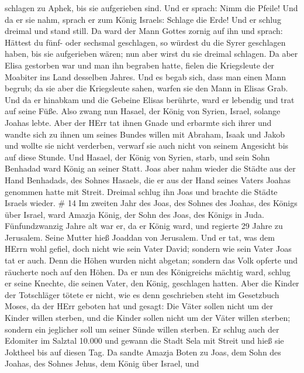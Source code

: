 schlagen zu Aphek, bis sie aufgerieben sind.  Und er
sprach: Nimm die Pfeile! Und da er sie nahm, sprach er zum König
Israels: Schlage die Erde! Und er schlug dreimal und stand still.
 Da ward der Mann Gottes zornig auf ihn und sprach: Hättest
du fünf- oder sechsmal geschlagen, so würdest du die Syrer geschlagen
haben, bis sie aufgerieben wären; nun aber wirst du sie dreimal
schlagen.  Da aber Elisa gestorben war und man ihn begraben
hatte, fielen die Kriegsleute der Moabiter ins Land desselben Jahres.
 Und es begab sich, dass man einen Mann begrub; da sie aber
die Kriegsleute sahen, warfen sie den Mann in Elisas Grab. Und da er
hinabkam und die Gebeine Elisas berührte, ward er lebendig und trat auf
seine Füße.  Also zwang nun Hasael, der König von Syrien,
Israel, solange Joahas lebte.  Aber der HErr tat ihnen
Gnade und erbarmte sich ihrer und wandte sich zu ihnen um seines Bundes
willen mit Abraham, Isaak und Jakob und wollte sie nicht verderben,
verwarf sie auch nicht von seinem Angesicht bis auf diese Stunde.
 Und Hasael, der König von Syrien, starb, und sein Sohn
Benhadad ward König an seiner Statt.  Joas aber nahm wieder
die Städte aus der Hand Benhadads, des Sohnes Hasaels, die er aus der
Hand seines Vaters Joahas genommen hatte mit Streit. Dreimal schlug ihn
Joas und brachte die Städte Israels wieder. \# 14  Im
zweiten Jahr des Joas, des Sohnes des Joahas, des Königs über Israel,
ward Amazja König, der Sohn des Joas, des Königs in Juda. 
Fünfundzwanzig Jahre alt war er, da er König ward, und regierte 29 Jahre
zu Jerusalem. Seine Mutter hieß Joaddan von Jerusalem.  Und
er tat, was dem HErrn wohl gefiel, doch nicht wie sein Vater David;
sondern wie sein Vater Joas tat er auch.  Denn die Höhen
wurden nicht abgetan; sondern das Volk opferte und räucherte noch auf
den Höhen.  Da er nun des Königreichs mächtig ward, schlug
er seine Knechte, die seinen Vater, den König, geschlagen hatten.
 Aber die Kinder der Totschläger tötete er nicht, wie es
denn geschrieben steht im Gesetzbuch Moses, da der HErr geboten hat und
gesagt: Die Väter sollen nicht um der Kinder willen sterben, und die
Kinder sollen nicht um der Väter willen sterben; sondern ein jeglicher
soll um seiner Sünde willen sterben.  Er schlug auch der
Edomiter im Salztal 10.000 und gewann die Stadt Sela mit Streit und hieß
sie Joktheel bis auf diesen Tag.  Da sandte Amazja Boten zu
Joas, dem Sohn des Joahas, des Sohnes Jehus, dem König über Israel, und
